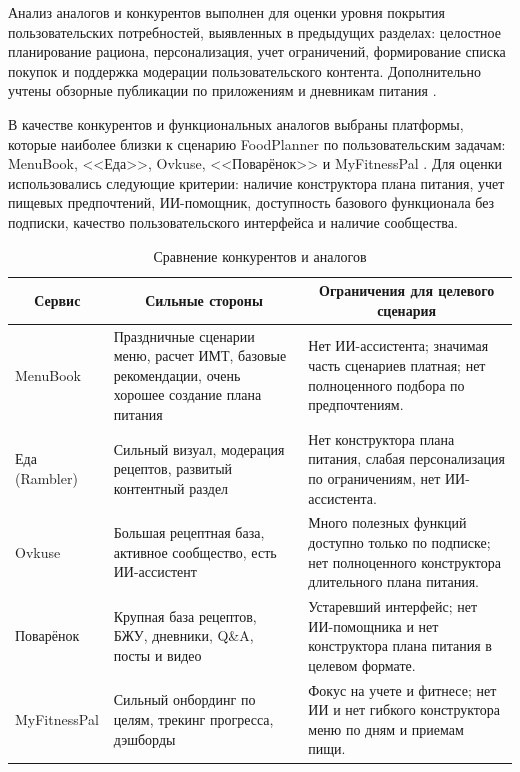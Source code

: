 Анализ аналогов и конкурентов выполнен для оценки уровня покрытия пользовательских потребностей, выявленных в предыдущих разделах: целостное планирование рациона, персонализация, учет ограничений, формирование списка покупок и поддержка модерации пользовательского контента. Дополнительно учтены обзорные публикации по приложениям и дневникам питания \cite{nutristeppe_diaries_2026,institutfitnesa_apps_2026,sportmaster_apps_2026}.

В качестве конкурентов и функциональных аналогов выбраны платформы, которые наиболее близки к сценарию FoodPlanner по пользовательским задачам: MenuBook, <<Еда>>, Ovkuse, <<Поварёнок>> и MyFitnessPal \cite{menubook2026,eda2026,ovkuse2026,povarenok2026,myfitnesspal2026}. Для оценки использовались следующие критерии: наличие конструктора плана питания, учет пищевых предпочтений, ИИ-помощник, доступность базового функционала без подписки, качество пользовательского интерфейса и наличие сообщества.

\begin{table}[H]
\caption{Сравнение конкурентов и аналогов}
\label{tab:analog-competitors}
\small
\begin{tabular}{|p{}|p{}|p{}|}
\hline
\multicolumn{1}{|c|}{Сервис} & \multicolumn{1}{c|}{Сильные стороны} & \multicolumn{1}{c|}{Ограничения для целевого сценария} \\ \hline
MenuBook & Праздничные сценарии меню, расчет ИМТ, базовые рекомендации, очень хорошее создание плана питания & Нет ИИ-ассистента; значимая часть сценариев платная; нет полноценного подбора по предпочтениям. \\ \hline
Еда (Rambler) & Сильный визуал, модерация рецептов, развитый контентный раздел & Нет конструктора плана питания, слабая персонализация по ограничениям, нет ИИ-ассистента. \\ \hline
Ovkuse & Большая рецептная база, активное сообщество, есть ИИ-ассистент & Много полезных функций доступно только по подписке; нет полноценного конструктора длительного плана питания. \\ \hline
Поварёнок & Крупная база рецептов, БЖУ, дневники, Q\&A, посты и видео & Устаревший интерфейс; нет ИИ-помощника и нет конструктора плана питания в целевом формате. \\ \hline
MyFitnessPal & Сильный онбординг по целям, трекинг прогресса, дэшборды & Фокус на учете и фитнесе; нет ИИ и нет гибкого конструктора меню по дням и приемам пищи. \\ \hline
\end{tabular}
\normalsize
\end{table}

